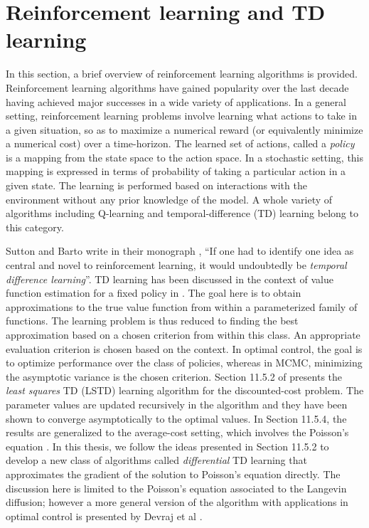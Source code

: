 

\section{Reinforcement learning and TD learning}
\label{rl_td}
In this section, a brief overview of reinforcement learning algorithms is provided. Reinforcement learning algorithms have gained popularity over the last decade having achieved major successes in a wide variety of applications. In a general setting, reinforcement learning problems involve learning what actions to take in a given situation, so as to maximize a numerical reward (or equivalently minimize a numerical cost) over a time-horizon. The learned set of actions, called a \textit{policy} is a mapping from the state space to the action space. In a stochastic setting, this mapping is expressed in terms of probability of taking a particular action in a given state. The learning is performed based on interactions with the environment without any prior knowledge of the model. A whole variety of algorithms including Q-learning and temporal-difference (TD) learning belong to this category. 

Sutton and Barto write in their monograph \cite{sutbar98}, ``If one had to identify one idea as central and novel to reinforcement learning, it would undoubtedly be \textit{temporal difference learning}''. TD learning has been discussed in the context of value function estimation for a fixed policy in \cite{ctcn}. The goal here is to obtain approximations to the true value function from within a parameterized family of functions. The learning problem is thus reduced to finding the best approximation based on a chosen criterion from within this class. An appropriate evaluation criterion is chosen based on the context. In optimal control, the goal is to optimize performance over the class of policies, whereas in MCMC, minimizing the asymptotic variance is the chosen criterion. Section 11.5.2 of \cite{ctcn} presents the \textit{least squares} TD (LSTD) learning algorithm for the discounted-cost problem. The parameter values are updated recursively in the algorithm and they have been shown to converge asymptotically to the optimal values. In Section 11.5.4, the results are generalized to the average-cost setting, which involves the Poisson's equation . In this thesis, we follow the ideas presented in Section 11.5.2 to develop a new class of algorithms called \textit{differential} TD learning that approximates the gradient of the solution to Poisson's equation directly. The discussion here is limited to the Poisson's equation associated to the Langevin diffusion; however a more general version of the algorithm with applications in optimal control is presented by Devraj et al \cite{devmey16arXiv}.
 
